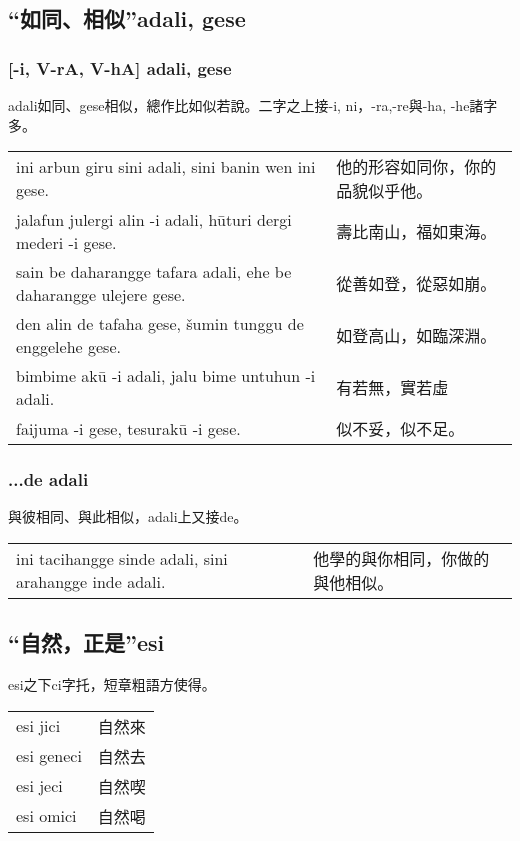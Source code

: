 \documentclass{article}
\begin{document}
\subsection{“如同、相似”adali, gese}
\subsubsection{[-i, V-rA, V-hA] adali, gese}
\noindent adali如同、gese相似，總作比如似若說。二字之上接-i, ni，-ra,-re與-ha, -he諸字多。
\begin{center}
    \begin{tabularx}{\textwidth}{XX}
     ini arbun giru sini adali, sini banin wen ini gese. &他的形容如同你，你的品貌似乎他。\\
     jalafun julergi alin -i adali, h\={u}turi dergi mederi -i gese. &壽比南山，福如東海。\\
     sain be daharangge tafara adali, ehe be daharangge ulejere gese. &從善如登，從惡如崩。\\
     den alin de tafaha gese, \v{s}umin tunggu de enggelehe gese. &如登高山，如臨深淵。\\
     bimbime ak\={u} -i adali, jalu bime untuhun -i adali. &有若無，實若虛\\
     faijuma -i gese, tesurak\={u} -i gese. &似不妥，似不足。
    \end{tabularx}
\end{center}

\subsubsection{...de adali}
\noindent 與彼相同、與此相似，adali上又接de。
\begin{center}
    \begin{tabularx}{\textwidth}{XX}
     ini tacihangge sinde adali, sini arahangge inde adali. &他學的與你相同，你做的與他相似。
    \end{tabularx}
\end{center}


\subsection{“自然，正是”esi}
\noindent esi之下ci字托，短章粗語方使得。
\begin{center}
    \begin{tabularx}{\textwidth}{XX}
     esi jici&自然來\\esi geneci&自然去\\esi jeci&自然喫\\esi omici&自然喝
    \end{tabularx}
\end{center}
\end{document}

